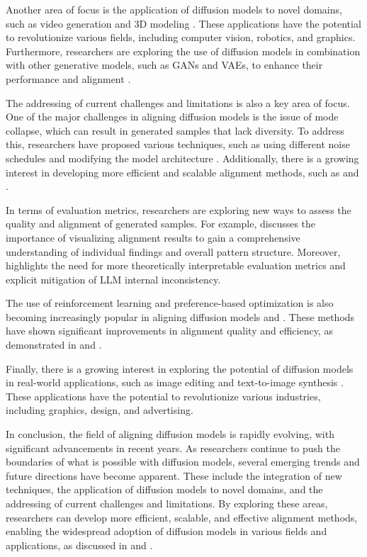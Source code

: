 \documentclass[11pt,a4paper]{article}
\begin{document}
Another area of focus is the application of diffusion models to novel domains, such as video generation \cite{doi:10.1109/cvpr52734.2025.00750} and 3D modeling \cite{arxiv:2601.14056}. These applications have the potential to revolutionize various fields, including computer vision, robotics, and graphics. Furthermore, researchers are exploring the use of diffusion models in combination with other generative models, such as GANs and VAEs, to enhance their performance and alignment \cite{doi:10.1145/3626235}.

The addressing of current challenges and limitations is also a key area of focus. One of the major challenges in aligning diffusion models is the issue of mode collapse, which can result in generated samples that lack diversity. To address this, researchers have proposed various techniques, such as using different noise schedules \cite{doi:10.1186/1471-2105-12-144} and modifying the model architecture \cite{doi:10.3115/1699510.1699540}. Additionally, there is a growing interest in developing more efficient and scalable alignment methods, such as \cite{doi:10.1186/s12864-020-6569-1} and \cite{arxiv:2502.06805}.

In terms of evaluation metrics, researchers are exploring new ways to assess the quality and alignment of generated samples. For example, \cite{doi:10.1109/tvcg.2020.3028975} discusses the importance of visualizing alignment results to gain a comprehensive understanding of individual findings and overall pattern structure. Moreover, \cite{arxiv:2408.13006} highlights the need for more theoretically interpretable evaluation metrics and explicit mitigation of LLM internal inconsistency.

The use of reinforcement learning and preference-based optimization is also becoming increasingly popular in aligning diffusion models \cite{doi:10.1109/cvpr52734.2025.02198} and \cite{arxiv:2402.05749}. These methods have shown significant improvements in alignment quality and efficiency, as demonstrated in \cite{arxiv:2503.12575} and \cite{doi:10.1093/nar/gkae607}.

Finally, there is a growing interest in exploring the potential of diffusion models in real-world applications, such as image editing \cite{arxiv:2307.02421} and text-to-image synthesis \cite{arxiv:2404.03653}. These applications have the potential to revolutionize various industries, including graphics, design, and advertising.

In conclusion, the field of aligning diffusion models is rapidly evolving, with significant advancements in recent years. As researchers continue to push the boundaries of what is possible with diffusion models, several emerging trends and future directions have become apparent. These include the integration of new techniques, the application of diffusion models to novel domains, and the addressing of current challenges and limitations. By exploring these areas, researchers can develop more efficient, scalable, and effective alignment methods, enabling the widespread adoption of diffusion models in various fields and applications, as discussed in \cite{arxiv:2403.04204} and \cite{arxiv:2503.14504}.
\end{document}
